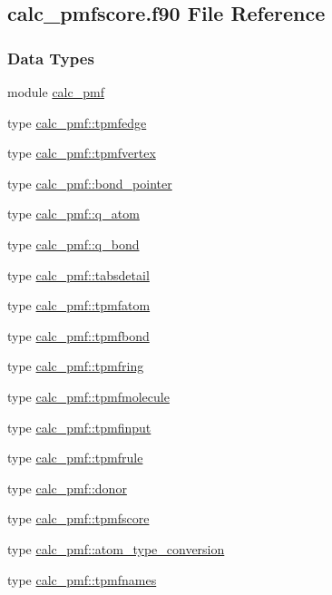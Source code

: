 \hypertarget{calc__pmfscore_8f90}{\subsection{calc\-\_\-pmfscore.\-f90 File Reference}
\label{calc__pmfscore_8f90}
}
\subsubsection*{Data Types}
\begin{DoxyCompactItemize}
\item 
module \hyperlink{classcalc__pmf}{calc\-\_\-pmf}
\item 
type \hyperlink{structcalc__pmf_1_1tpmfedge}{calc\-\_\-pmf\-::tpmfedge}
\item 
type \hyperlink{structcalc__pmf_1_1tpmfvertex}{calc\-\_\-pmf\-::tpmfvertex}
\item 
type \hyperlink{structcalc__pmf_1_1bond__pointer}{calc\-\_\-pmf\-::bond\-\_\-pointer}
\item 
type \hyperlink{structcalc__pmf_1_1q__atom}{calc\-\_\-pmf\-::q\-\_\-atom}
\item 
type \hyperlink{structcalc__pmf_1_1q__bond}{calc\-\_\-pmf\-::q\-\_\-bond}
\item 
type \hyperlink{structcalc__pmf_1_1tabsdetail}{calc\-\_\-pmf\-::tabsdetail}
\item 
type \hyperlink{structcalc__pmf_1_1tpmfatom}{calc\-\_\-pmf\-::tpmfatom}
\item 
type \hyperlink{structcalc__pmf_1_1tpmfbond}{calc\-\_\-pmf\-::tpmfbond}
\item 
type \hyperlink{structcalc__pmf_1_1tpmfring}{calc\-\_\-pmf\-::tpmfring}
\item 
type \hyperlink{structcalc__pmf_1_1tpmfmolecule}{calc\-\_\-pmf\-::tpmfmolecule}
\item 
type \hyperlink{structcalc__pmf_1_1tpmfinput}{calc\-\_\-pmf\-::tpmfinput}
\item 
type \hyperlink{structcalc__pmf_1_1tpmfrule}{calc\-\_\-pmf\-::tpmfrule}
\item 
type \hyperlink{structcalc__pmf_1_1donor}{calc\-\_\-pmf\-::donor}
\item 
type \hyperlink{structcalc__pmf_1_1tpmfscore}{calc\-\_\-pmf\-::tpmfscore}
\item 
type \hyperlink{structcalc__pmf_1_1atom__type__conversion}{calc\-\_\-pmf\-::atom\-\_\-type\-\_\-conversion}
\item 
type \hyperlink{structcalc__pmf_1_1tpmfnames}{calc\-\_\-pmf\-::tpmfnames}
\end{DoxyCompactItemize}
